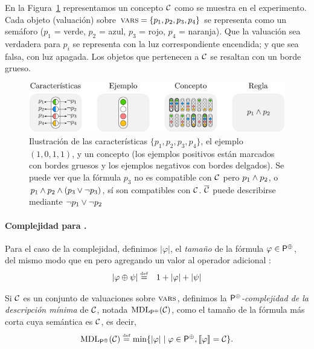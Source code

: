 En la Figura~\ref{semaforos} representamos un concepto $\mathcal{C}$ como se muestra en el experimento. Cada objeto (valuación) sobre $\textsc{vars}=\{p_1,p_2,p_3,p_4\}$ se representa como un semáforo ($p_1$ = verde, $p_2$ = azul, $p_3$ = rojo, $p_4$ = naranja). Que la valuación sea verdadera para $p_i$ se representa con la luz correspondiente encendida; y que sea falsa, con luz apagada. Los objetos que pertenecen a $\mathcal{C}$ se resaltan con un borde grueso. 

\begin{figure}[h!]
\includegraphics[scale=.6]{../figuras/pre/notacion.pdf}
\caption{Ilustración de las características $\{p_1,p_2,p_3,p_4\}$, el ejemplo $(1,0,1,1)$, y un concepto (los ejemplos positivos están marcados con bordes gruesos y los ejemplos negativos con bordes delgados). Se puede ver que la fórmula $p_3$ no es compatible con $\mathcal{C}$ pero $p_1 \wedge p_2$, o $p_1 \wedge p_2 \wedge (p_3 \vee \lnot p_3)$, sí son compatibles con $\mathcal{C}$. $\overline {\mathcal{C}}$ puede describirse mediante $\lnot p_1\vee \lnot p_2$ }\label{semaforos}
\end{figure}


\paragraph{Complejidad para \gramboolxor.} Para el caso de la complejidad, definimos $|\varphi|$, el {\em tamaño} de la fórmula $\varphi\in{\sf P}^\oplus$, del mismo modo que en \grambool pero agregando un valor al operador adicional :
\begin{eqnarray*}
|\varphi\oplus\psi| &\stackrel{\scriptscriptstyle \mathrm{def}}{=}& 1+|\varphi|+|\psi|
\end{eqnarray*}


Si $\mathcal{C}$ es un conjunto de valuaciones sobre $\textsc{vars}$, definimos la {\em ${\sf P}^\oplus$-complejidad de la descripción mínima} de $\mathcal{C}$, notada ${\rm MDL}_{{\sf P}^\oplus}(\mathcal{C})$, como el tamaño de la fórmula más corta cuya semántica es $\mathcal{C}$, es decir,
$$
{\rm MDL}_{{\sf P}^\oplus}(\mathcal{C})\stackrel{\scriptscriptstyle \mathrm{def}}{=}\min\{|\varphi|\mid \varphi\in{\sf P}^\oplus,\llbracket \varphi\rrbracket=\mathcal{C}\}.
$$

